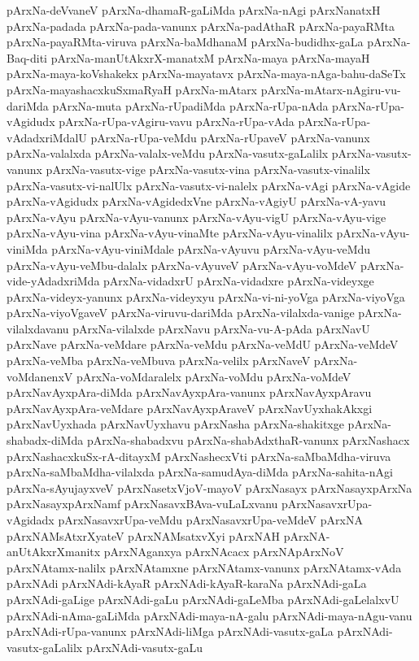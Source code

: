 {pArxNa-deVvaneV
pArxNa-dhamaR-gaLiMda
pArxNa-nAgi
pArxNanatxH
pArxNa-padada
pArxNa-pada-vanunx
pArxNa-padAthaR
pArxNa-payaRMta
pArxNa-payaRMta-viruva
pArxNa-baMdhanaM
pArxNa-budidhx-gaLa
pArxNa-Baq-diti
pArxNa-manUtAkxrX-manatxM
pArxNa-maya
pArxNa-mayaH
pArxNa-maya-koVshakekx
pArxNa-mayatavx
pArxNa-maya-nAga-bahu-daSeTx
pArxNa-mayashacxkuSxmaRyaH
pArxNa-mAtarx
pArxNa-mAtarx-nAgiru-vu-dariMda
pArxNa-muta
pArxNa-rUpadiMda
pArxNa-rUpa-nAda
pArxNa-rUpa-vAgidudx
pArxNa-rUpa-vAgiru-vavu
pArxNa-rUpa-vAda
pArxNa-rUpa-vAdadxriMdalU
pArxNa-rUpa-veMdu
pArxNa-rUpaveV
pArxNa-vanunx
pArxNa-valalxda
pArxNa-valalx-veMdu
pArxNa-vasutx-gaLalilx
pArxNa-vasutx-vanunx
pArxNa-vasutx-vige
pArxNa-vasutx-vina
pArxNa-vasutx-vinalilx
pArxNa-vasutx-vi-nalUlx
pArxNa-vasutx-vi-nalelx
pArxNa-vAgi
pArxNa-vAgide
pArxNa-vAgidudx
pArxNa-vAgidedxVne
pArxNa-vAgiyU
pArxNa-vA-yavu
pArxNa-vAyu
pArxNa-vAyu-vanunx
pArxNa-vAyu-vigU
pArxNa-vAyu-vige
pArxNa-vAyu-vina
pArxNa-vAyu-vinaMte
pArxNa-vAyu-vinalilx
pArxNa-vAyu-viniMda
pArxNa-vAyu-viniMdale
pArxNa-vAyuvu
pArxNa-vAyu-veMdu
pArxNa-vAyu-veMbu-dalalx
pArxNa-vAyuveV
pArxNa-vAyu-voMdeV
pArxNa-vide-yAdadxriMda
pArxNa-vidadxrU
pArxNa-vidadxre
pArxNa-videyxge
pArxNa-videyx-yanunx
pArxNa-videyxyu
pArxNa-vi-ni-yoVga
pArxNa-viyoVga
pArxNa-viyoVgaveV
pArxNa-viruvu-dariMda
pArxNa-vilalxda-vanige
pArxNa-vilalxdavanu
pArxNa-vilalxde
pArxNavu
pArxNa-vu-A-pAda
pArxNavU
pArxNave
pArxNa-veMdare
pArxNa-veMdu
pArxNa-veMdU
pArxNa-veMdeV
pArxNa-veMba
pArxNa-veMbuva
pArxNa-velilx
pArxNaveV
pArxNa-voMdanenxV
pArxNa-voMdaralelx
pArxNa-voMdu
pArxNa-voMdeV
pArxNavAyxpAra-diMda
pArxNavAyxpAra-vanunx
pArxNavAyxpAravu
pArxNavAyxpAra-veMdare
pArxNavAyxpAraveV
pArxNavUyxhakAkxgi
pArxNavUyxhada
pArxNavUyxhavu
pArxNasha
pArxNa-shakitxge
pArxNa-shabadx-diMda
pArxNa-shabadxvu
pArxNa-shabAdxthaR-vanunx
pArxNashacx
pArxNashacxkuSx-rA-ditayxM
pArxNashecxVti
pArxNa-saMbaMdha-viruva
pArxNa-saMbaMdha-vilalxda
pArxNa-samudAya-diMda
pArxNa-sahita-nAgi
pArxNa-sAyujayxveV
pArxNasetxVjoV-mayoV
pArxNasayx
pArxNasayxpArxNa
pArxNasayxpArxNamf
pArxNasavxBAva-vuLaLxvanu
pArxNasavxrUpa-vAgidadx
pArxNasavxrUpa-veMdu
pArxNasavxrUpa-veMdeV
pArxNA
pArxNAMsAtxrXyateV
pArxNAMsatxvXyi
pArxNAH
pArxNA-anUtAkxrXmanitx
pArxNAganxya
pArxNAcacx
pArxNApArxNoV
pArxNAtamx-nalilx
pArxNAtamxne
pArxNAtamx-vanunx
pArxNAtamx-vAda
pArxNAdi
pArxNAdi-kAyaR
pArxNAdi-kAyaR-karaNa
pArxNAdi-gaLa
pArxNAdi-gaLige
pArxNAdi-gaLu
pArxNAdi-gaLeMba
pArxNAdi-gaLelalxvU
pArxNAdi-nAma-gaLiMda
pArxNAdi-maya-nA-galu
pArxNAdi-maya-nAgu-vanu
pArxNAdi-rUpa-vanunx
pArxNAdi-liMga
pArxNAdi-vasutx-gaLa
pArxNAdi-vasutx-gaLalilx
pArxNAdi-vasutx-gaLu
}
